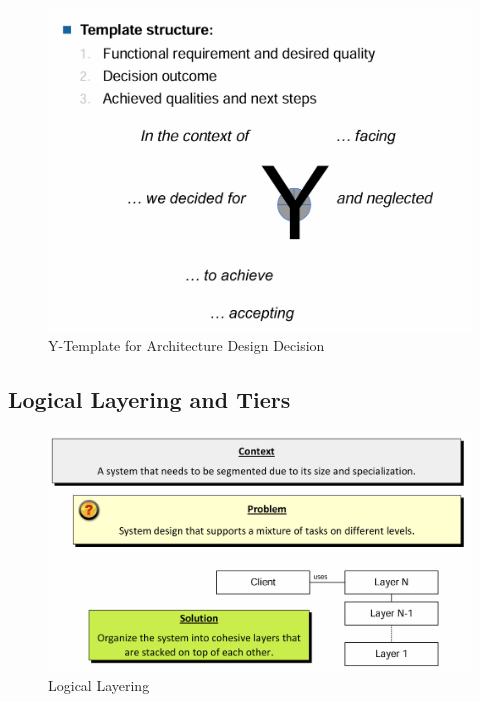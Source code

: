 \documentclass[../Main.tex]{subfiles}
\begin{document}
\begin{figure}[H]
    \centering
    \includegraphics{Images/yarchitecturedesign.png}
    \caption{Y-Template for Architecture Design Decision}
\end{figure}


\subsection{Logical Layering and Tiers}

\begin{figure}[H]
    \centering
    \includegraphics[width=1\linewidth]{Images/logicallayering.png}
    \caption{Logical Layering}
\end{figure}
\end{document}
